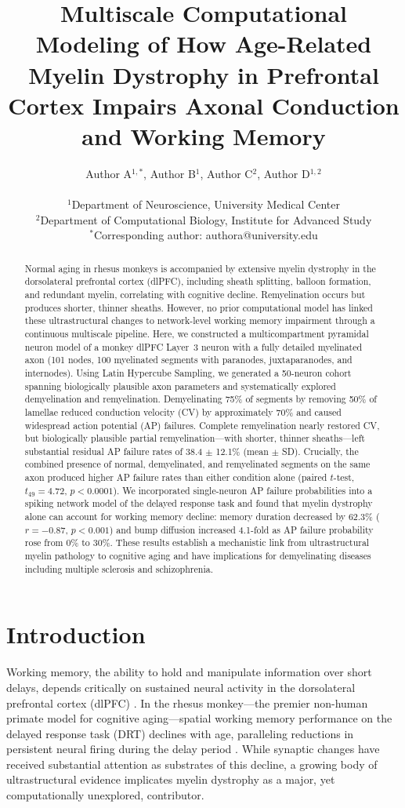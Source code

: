 \documentclass[11pt]{article}
\title{Multiscale Computational Modeling of How Age-Related Myelin Dystrophy in Prefrontal Cortex Impairs Axonal Conduction and Working Memory}
\author{
Author A$^{1,*}$, Author B$^{1}$, Author C$^{2}$, Author D$^{1,2}$ \\
\\
$^{1}$Department of Neuroscience, University Medical Center \\
$^{2}$Department of Computational Biology, Institute for Advanced Study \\
$^{*}$Corresponding author: authora@university.edu
}
\date{}
\begin{document}
\maketitle

\begin{abstract}
Normal aging in rhesus monkeys is accompanied by extensive myelin dystrophy in the dorsolateral prefrontal cortex (dlPFC), including sheath splitting, balloon formation, and redundant myelin, correlating with cognitive decline. Remyelination occurs but produces shorter, thinner sheaths. However, no prior computational model has linked these ultrastructural changes to network-level working memory impairment through a continuous multiscale pipeline. Here, we constructed a multicompartment pyramidal neuron model of a monkey dlPFC Layer~3 neuron with a fully detailed myelinated axon (101 nodes, 100 myelinated segments with paranodes, juxtaparanodes, and internodes). Using Latin Hypercube Sampling, we generated a 50-neuron cohort spanning biologically plausible axon parameters and systematically explored demyelination and remyelination. Demyelinating 75\% of segments by removing 50\% of lamellae reduced conduction velocity (CV) by approximately 70\% and caused widespread action potential (AP) failures. Complete remyelination nearly restored CV, but biologically plausible partial remyelination---with shorter, thinner sheaths---left substantial residual AP failure rates of 38.4 $\pm$ 12.1\% (mean $\pm$ SD). Crucially, the combined presence of normal, demyelinated, and remyelinated segments on the same axon produced higher AP failure rates than either condition alone (paired $t$-test, $t_{49}=4.72$, $p<0.0001$). We incorporated single-neuron AP failure probabilities into a spiking network model of the delayed response task and found that myelin dystrophy alone can account for working memory decline: memory duration decreased by 62.3\% ($r=-0.87$, $p<0.001$) and bump diffusion increased 4.1-fold as AP failure probability rose from 0\% to 30\%. These results establish a mechanistic link from ultrastructural myelin pathology to cognitive aging and have implications for demyelinating diseases including multiple sclerosis and schizophrenia.
\end{abstract}

\section{Introduction}

Working memory, the ability to hold and manipulate information over short delays, depends critically on sustained neural activity in the dorsolateral prefrontal cortex (dlPFC) \citep{goldman-rakic1995, funahashi1989}. In the rhesus monkey---the premier non-human primate model for cognitive aging---spatial working memory performance on the delayed response task (DRT) declines with age, paralleling reductions in persistent neural firing during the delay period \citep{chen2004}. While synaptic changes have received substantial attention as substrates of this decline, a growing body of ultrastructural evidence implicates myelin dystrophy as a major, yet computationally unexplored, contributor.
\end{document}
